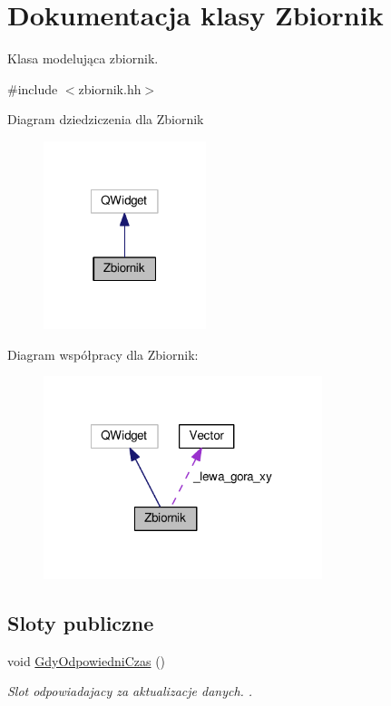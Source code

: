 \hypertarget{class_zbiornik}{\section{Dokumentacja klasy Zbiornik}
\label{class_zbiornik}
}


Klasa modelująca zbiornik.  




{\ttfamily \#include $<$zbiornik.\-hh$>$}



Diagram dziedziczenia dla Zbiornik\nopagebreak
\begin{figure}[H]
\begin{center}
\leavevmode
\includegraphics[width=134pt]{class_zbiornik__inherit__graph}
\end{center}
\end{figure}


Diagram współpracy dla Zbiornik\-:\nopagebreak
\begin{figure}[H]
\begin{center}
\leavevmode
\includegraphics[width=230pt]{class_zbiornik__coll__graph}
\end{center}
\end{figure}
\subsection*{Sloty publiczne}
\begin{DoxyCompactItemize}
\item 
void \hyperlink{class_zbiornik_aa07ceb0fcbf307f0aa1eb75c32f3f47e}{Gdy\-Odpowiedni\-Czas} ()
\begin{DoxyCompactList}\small\item\em Slot odpowiadajacy za aktualizacje danych. . \end{DoxyCompactList}\end{DoxyCompactItemize}
